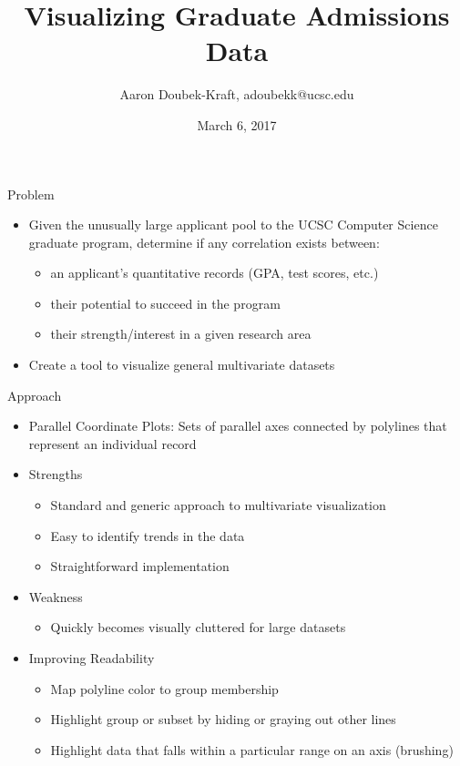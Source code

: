 \documentclass{beamer}
\title{Visualizing Graduate Admissions Data}
\author{Aaron Doubek-Kraft, adoubekk@ucsc.edu}
\date{March 6, 2017}
\begin{document}
	
	\frame{\titlepage}
	
	\begin{frame}{Problem}
		\begin{itemize}
			\item Given the unusually large applicant pool to the UCSC Computer Science graduate program, determine if any correlation exists between:
			\begin{itemize} \item an applicant's quantitative records (GPA, test scores, etc.) 
							\item their potential to succeed in the program
							\item their strength/interest in a given research area
			\end{itemize}
			\item Create a tool to visualize general multivariate datasets
		\end{itemize}	
	\end{frame}
	
	\begin{frame}{Approach}
		\begin{itemize}
			\item Parallel Coordinate Plots: Sets of parallel axes connected by polylines that represent an individual record
			\item Strengths
			\begin{itemize}
				\item Standard and generic approach to multivariate visualization
				\item Easy to identify trends in the data
				\item Straightforward implementation
			\end{itemize}
			\item Weakness
			\begin{itemize}
				\item Quickly becomes visually cluttered for large datasets
			\end{itemize}
			\item Improving Readability
			\begin{itemize}
				\item Map polyline color to group membership
				\item Highlight group or subset by hiding or graying out other lines
				\item Highlight data that falls within a particular range on an axis (brushing)
			\end{itemize}
		\end{itemize}
	
	\end{frame}
	
\end{document}
